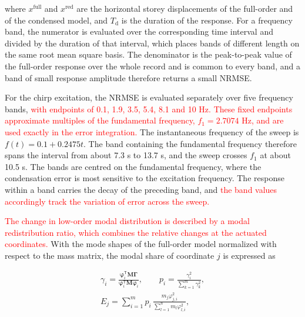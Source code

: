 \documentclass[a4paper,fleqn,review,12pt]{cas-sc}
\numberwithin{equation}{section}
\newcommand{\rev}[1]{\textcolor{red}{#1}}
\begin{document}
\noindent where \(x^{\mathrm{full}}\) and \(x^{\mathrm{red}}\) are the horizontal storey displacements of the full-order and of the condensed model, and \(T_{\mathrm{d}}\) is the duration of the response. For a frequency band, the numerator is evaluated over the corresponding time interval and divided by the duration of that interval, which places bands of different length on the same root mean square basis. The denominator is the peak-to-peak value of the full-order response over the whole record and is common to every band, and a band of small response amplitude therefore returns a small NRMSE.

For the chirp excitation, the NRMSE is evaluated separately over five frequency bands, \rev{with endpoints of 0.1, 1.9, 3.5, 5.4, 8.1 and 10 Hz. These fixed endpoints approximate multiples of the fundamental frequency, \(f_1=2.7074\) Hz, and are used exactly in the error integration.} The instantaneous frequency of the sweep is \(f(t)=0.1+0.2475t\). The band containing the fundamental frequency therefore spans the interval from about 7.3 s to 13.7 s, and the sweep crosses \(f_{1}\) at about 10.5 s. The bands are centred on the fundamental frequency, where the condensation error is most sensitive to the excitation frequency. The response within a band carries the decay of the preceding band, and \rev{the band values accordingly track the variation of error across the sweep.}

\rev{The change in low-order modal distribution is described by a modal redistribution ratio, which combines the relative changes at the actuated coordinates.} With the mode shapes of the full-order model normalized with respect to the mass matrix, the modal share of coordinate \(j\) is expressed as

\vspace{-3.5em}
\begin{equation}
	\begin{gathered}
		\gamma_{i}=
		\frac{\bm{\varphi}_{i}^{\mathsf{T}}\mathbf{M}\bm{\Gamma}}
		{\bm{\varphi}_{i}^{\mathsf{T}}\mathbf{M}\bm{\varphi}_{i}},
		\qquad
		p_{i}=\frac{\gamma_{i}^{2}}{\displaystyle\sum_{k=1}^{m}\gamma_{k}^{2}},\\[2pt]
		E_{j}=\sum_{i=1}^{m}p_{i}\,
		\frac{m_{j}\varphi_{j,i}^{2}}{\displaystyle\sum_{l=1}^{n}m_{l}\varphi_{l,i}^{2}},
	\end{gathered}
	\label{eq:dof-energy}
\end{equation}
\vspace{-3.5em}
\end{document}
